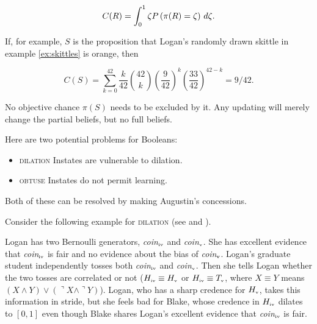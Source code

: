 \documentclass[11pt]{article}
\begin{document}
\begin{equation}
  \label{eq:s2}
  C(R)=\int_{0}^{1}\zeta{}P\left(\pi(R)=\zeta\right)\,d\zeta{}.\bcut{21}
\end{equation}

{\noindent}If, for example, $S$ is the proposition that Logan's
randomly drawn skittle in example \ref{ex:skittles} is orange, then

\begin{equation}
  \label{eq:skit}
  C(S)=\sum_{k=0}^{42}\frac{k}{42}\binom{42}{k}\left(\frac{9}{42}\right)^{k}\left(\frac{33}{42}\right)^{42-k}=9/42.
\end{equation}

No objective chance $\pi(S)$ needs to be excluded by it. Any updating
will merely change the partial beliefs, but no full beliefs. 

Here are two potential problems for Booleans:

\begin{itemize}
\item \textsc{dilation} Instates are vulnerable to dilation.
\item \textsc{obtuse} Instates do not permit learning.
\end{itemize}

Both of these can be resolved by making Augustin's concessions. 

Consider the following example for \textsc{dilation} (see
 and ).

\begin{quotex}
  \label{ex:dilation} Logan has two Bernoulli
  generators, \textit{coin}$_{\mbox{\tiny{iv}}}$ and
  \textit{coin}$_{\mbox{\tiny{v}}}$. She has excellent evidence that
  \textit{coin}$_{\mbox{\tiny{iv}}}$ is fair and no evidence about the
  bias of \textit{coin}$_{\mbox{\tiny{v}}}$. Logan's graduate student
  independently tosses both \textit{coin}$_{\mbox{\tiny{iv}}}$ and
  \textit{coin}$_{\mbox{\tiny{v}}}$. Then she tells Logan whether the
  two tosses are correlated or not
  ($H_{\mbox{\tiny{iv}}}\equiv{}H_{\mbox{\tiny{v}}}$ or
  $H_{\mbox{\tiny{iv}}}\equiv{}T_{\mbox{\tiny{v}}}$, where
  $X\equiv{}Y$ means
  $(X\wedge{}Y)\vee(\urcorner{}X\wedge\urcorner{}Y)$). Logan, who has
  a sharp credence for $H_{\mbox{\tiny{v}}}$, takes this information
  in stride, but she feels bad for Blake, whose credence in
  $H_{\mbox{\tiny{iv}}}$ dilates to $[0,1]$ even though Blake shares
  Logan's excellent evidence that \textit{coin}$_{\mbox{\tiny{iv}}}$
  is fair.
\end{quotex}
\end{document}
